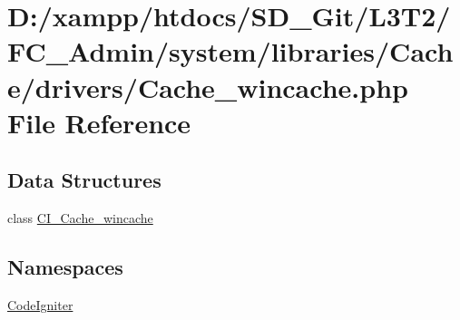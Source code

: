 \hypertarget{_cache__wincache_8php}{}\section{D\+:/xampp/htdocs/\+S\+D\+\_\+\+Git/\+L3\+T2/\+F\+C\+\_\+\+Admin/system/libraries/\+Cache/drivers/\+Cache\+\_\+wincache.php File Reference}
\label{_cache__wincache_8php}
\subsection*{Data Structures}
\begin{DoxyCompactItemize}
\item 
class \hyperlink{class_c_i___cache__wincache}{C\+I\+\_\+\+Cache\+\_\+wincache}
\end{DoxyCompactItemize}
\subsection*{Namespaces}
\begin{DoxyCompactItemize}
\item 
 \hyperlink{namespace_code_igniter}{Code\+Igniter}
\end{DoxyCompactItemize}
